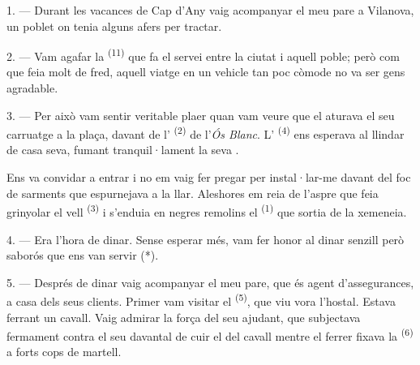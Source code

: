 

\VUsaut{4.0mm}
\VUsaut{3.0mm}
\VUfilet{16mm}
\VUsaut{5.6mm}
\VUsaut{3.0mm}

\VUsaut{3.0mm}

\VUsaut{4.0mm}

1. --- Durant les vacances de Cap d'Any vaig acompanyar el meu pare a Vilanova, un poblet on
tenia alguns afers per tractar.

2. --- Vam agafar la  \textsuperscript{(11)} que fa el servei entre la
ciutat i aquell poble; però com que feia molt de fred, aquell viatge en un vehicle tan poc
còmode no va ser gens agradable.

3. --- Per això vam sentir veritable plaer quan vam veure que el  aturava el
seu carruatge a la plaça, davant de l' \textsuperscript{(2)} de l'\textit{Ós
Blanc}. L' \textsuperscript{(4)} ens esperava al llindar de casa seva, fumant
tranquil·lament la seva .

Ens va convidar a entrar i no em vaig fer pregar per instal·lar-me davant del foc de sarments
que espurnejava a la llar. Aleshores em reia de l'aspre  que feia
grinyolar el vell  \textsuperscript{(3)} i s'enduia en negres remolins el
 \textsuperscript{(1)} que sortia de la xemeneia.

4. --- Era l'hora de dinar. Sense esperar més, vam fer honor al dinar senzill però saborós que
ens van servir (*).

\VUsaut{3.0mm}

5. --- Després de dinar vaig acompanyar el meu pare, que és agent d'assegurances, a casa dels
seus clients. Primer vam visitar el  \textsuperscript{(5)}, que viu vora
l'hostal. Estava ferrant un cavall. Vaig admirar la força del seu ajudant, que subjectava
fermament contra el seu davantal de cuir el  del cavall mentre el ferrer fixava
la  \textsuperscript{(6)} a forts cops de martell.

